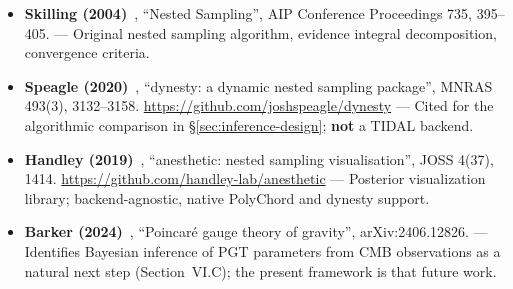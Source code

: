 \begin{itemize}
  \item \textbf{Skilling (2004)}~\cite{skilling2004nested}, ``Nested Sampling'',
    AIP Conference Proceedings 735, 395--405. --- Original nested sampling
    algorithm, evidence integral decomposition, convergence criteria.

  \item \textbf{Speagle (2020)}~\cite{speagle2020dynesty}, ``dynesty: a dynamic
    nested sampling package'', MNRAS 493(3), 3132--3158.
    \url{https://github.com/joshspeagle/dynesty} --- Cited for the algorithmic
    comparison in \S\ref{sec:inference-design}; \textbf{not} a TIDAL backend.

  \item \textbf{Handley (2019)}~\cite{handley2019anesthetic}, ``anesthetic:
    nested sampling visualisation'', JOSS 4(37), 1414.
    \url{https://github.com/handley-lab/anesthetic} --- Posterior
    visualization library; backend-agnostic, native PolyChord and dynesty support.

  \item \textbf{Barker (2024)}~\cite{barker2024poincare}, ``Poincar\'e gauge
    theory of gravity'', arXiv:2406.12826. --- Identifies Bayesian inference
    of PGT parameters from CMB observations as a natural next step
    (Section~VI.C); the present framework is that future work.
\end{itemize}
